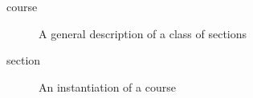 \begin{description}
  \item[course] A general description of a class of sections
  \item[section] An instantiation of a course
\end{description}
